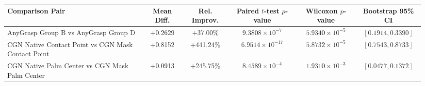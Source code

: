 \begin{tabular}{lccccc}
\hline
Comparison Pair & Mean Diff. & Rel. Improv. & Paired $t$-test $p$-value & Wilcoxon $p$-value & Bootstrap 95\% CI \\
\hline
AnyGrasp Group B vs AnyGrasp Group D & +0.2629 & +37.00\% & $9.3808 \times 10^{-7}$ & $5.9340 \times 10^{-5}$ & $[0.1914, 0.3390]$ \\
CGN Native Contact Point vs CGN Mask Contact Point & +0.8152 & +441.24\% & $6.9514 \times 10^{-17}$ & $5.8732 \times 10^{-5}$ & $[0.7543, 0.8733]$ \\
CGN Native Palm Center vs CGN Mask Palm Center & +0.0913 & +245.75\% & $8.4589 \times 10^{-4}$ & $1.9310 \times 10^{-3}$ & $[0.0477, 0.1372]$ \\
\hline
\end{tabular}
